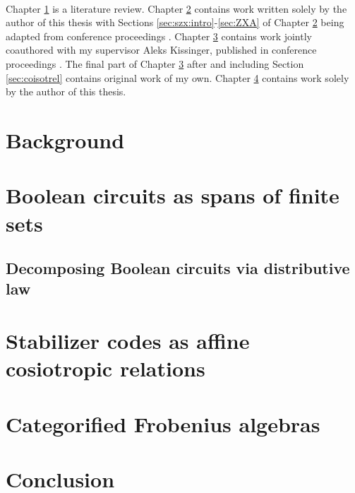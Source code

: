 \documentclass[12pt]{ociamthesis}  %
\begin{document}
\

Chapter \ref{chap:background} is a literature review.  Chapter \ref{chap:zxa} contains work written solely by the author of this thesis with Sections \ref{sec:szx:intro}-\ref{sec:ZXA} of Chapter \ref{chap:zxa} being adapted from conference proceedings \cite{zxa}.  Chapter \ref{chap:stab} contains work jointly coauthored with my supervisor Aleks Kissinger, published in conference proceedings \cite{lagrel}.  The final part of Chapter  \ref{chap:stab} after and including Section \ref{sec:coisotrel} contains original work of my own. Chapter \ref{chap:grothendieck} contains work solely by the author of this thesis.



\chapter{Background}
\label{chap:background}


\chapter{Boolean circuits as spans of finite sets}
\label{chap:zxa}


\section{Decomposing Boolean circuits via distributive law}


\chapter{Stabilizer codes as affine cosiotropic relations}
\label{chap:stab}


\chapter{Categorified Frobenius algebras}
\label{chap:grothendieck}


\chapter{Conclusion}
\label{chap:conclusion}

 

\end{document}
